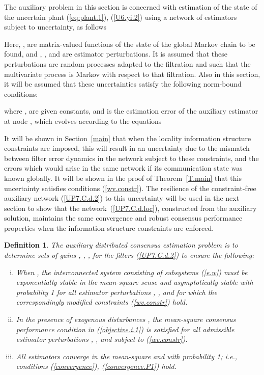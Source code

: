 \documentclass[a4paper,twocolumn]{autart}
\newtheorem{definition}{Definition}
\begin{document}
The auxiliary problem in this section is concerned with estimation of the
state of the uncertain plant (\ref{eq:plant.1}), (\ref{U6.yi.2}) using a
network of estimators subject to uncertainty, as follows 

Here, ,   are matrix-valued functions of the 
state of the global Markov chain  to be found, and ,
, and  are estimator perturbations. It is
assumed that these perturbations are random processes adapted to the filtration
 and such that the multivariate process 
 is Markov with respect to that
filtration. Also in this section, it will be assumed that these
uncertainties satisfy the following norm-bound conditions:

where ,  are given constants, and  
 is the estimation error of the auxiliary estimator 
at node , which evolves 
according to the
equations 
 

It will be shown in Section~\ref{main}
that when the locality information structure constraints are imposed,
this will result in an uncertainty due to the mismatch between filter error
dynamics in the network subject to these constraints, and 
the errors which would arise in the same network if its communication state was
known globally. It will be shown
in the proof of 
Theorem~\ref{T.main} that this uncertainty satisfies conditions
(\ref{wv.constr}). The resilience of the constraint-free auxiliary network 
(\ref{UP7.C.d.2}) to this uncertainty will be used in the next section to
show that the
network~(\ref{UP7.C.d.loc}), constructed from the auxiliary solution,
maintains the same convergence and robust  consensus performance
properties when the information structure constraints are enforced.    

\begin{definition}\label{Def1.aux}
The auxiliary distributed consensus estimation problem is to
determine sets of gains
, 
, , for the filters 
(\ref{UP7.C.d.2}) to ensure the following:
\begin{enumerate}[(i)]
  \item
When , the interconnected system consisting of
subsystems (\ref{e.w}) must be exponentially stable in the mean-square
sense and asymptotically 
stable with probability 1 for all estimator perturbations ,
, and  for which the correspondingly modified
constraints (\ref{wv.constr}) hold. 

\item
In the presence of exogenous disturbances , the
mean-square consensus 
performance condition in (\ref{objective.i.1}) is satisfied for all
admissible estimator perturbations  ,
, and  subject to (\ref{wv.constr}).

\item
 All estimators converge in the mean-square and with probability 1; i.e.,
 conditions (\ref{convergence}), (\ref{convergence.P1}) hold. 
\end{enumerate} 
\end{definition}
\end{document}
